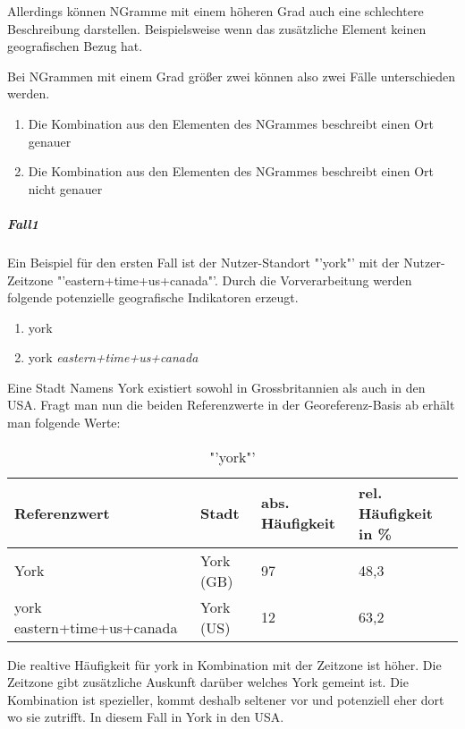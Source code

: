 					Allerdings können NGramme mit einem höheren Grad auch eine schlechtere Beschreibung darstellen. 
					Beispielsweise wenn das zusätzliche Element keinen geografischen Bezug hat.

					Bei NGrammen mit einem Grad größer zwei können also zwei Fälle unterschieden werden.

					\begin{enumerate}
						\item Die Kombination aus den Elementen des NGrammes beschreibt einen Ort genauer
						\item Die Kombination aus den Elementen des NGrammes beschreibt einen Ort nicht genauer
					\end{enumerate}

					\subparagraph{Fall1} 

						Ein Beispiel für den ersten Fall ist der Nutzer-Standort "'york"' mit der Nutzer-Zeitzone "'eastern+time+us+canada"'. 
						Durch die Vorverarbeitung werden folgende potenzielle geografische Indikatoren erzeugt.
						\begin{enumerate}		
							\item york
							\item york \textit{eastern+time+us+canada}
						\end{enumerate}		

						Eine Stadt Namens York existiert sowohl in Grossbritannien als auch in den USA.
						Fragt man nun die beiden Referenzwerte in der Georeferenz-Basis ab erhält man folgende Werte:

							\begin{table}[h]
								\centering
									\caption{"'york"'}
									\label{tab:york}
									\begin{tabular}{|l|l|l|l|}
									\hline
									Referenzwert 				& Stadt  	& abs. Häufigkeit & rel. Häufigkeit in \% \\ \hline \hline
									York          				& York (GB) & 97              & 48,3       \\ \hline
									york eastern+time+us+canada & York (US) & 12              & 63,2        \\ \hline
									\end{tabular}
							\end{table}

							Die realtive Häufigkeit für york in Kombination mit der Zeitzone ist höher. 
							Die Zeitzone gibt zusätzliche Auskunft darüber welches York gemeint ist. 
							Die Kombination ist spezieller, kommt deshalb seltener vor und potenziell eher dort wo sie zutrifft. 
							In diesem Fall in York in den USA. 

